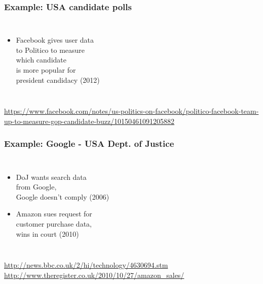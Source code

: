 \documentclass[dvipsnames]{beamer}
\theoremstyle{plain}
\begin{document}
\begin{frame}
  \frametitle{Example: USA candidate polls}

  \begin{columns}

    \begin{itemize}
      \item Facebook gives user data\\
        to Politico to measure\\
        which candidate\\
        is more popular for\\
        president candidacy (2012)
    \end{itemize}
  \end{columns}

  \medskip
  \tiny{\url{https://www.facebook.com/notes/us-politics-on-facebook/politico-facebook-team-up-to-measure-gop-candidate-buzz/10150461091205882}}\\
\end{frame}

\begin{frame}
  \frametitle{Example: Google - USA Dept. of Justice}

  \begin{columns}

    \begin{itemize}
      \item DoJ wants search data\\
        from Google,\\
        Google doesn't comply (2006)

      \pause
      \medskip
      \item Amazon sues request for\\
        customer purchase data,\\
        wins in court (2010)
    \end{itemize}
  \end{columns}

  \medskip
  \tiny{\url{http://news.bbc.co.uk/2/hi/technology/4630694.stm}}\\
  \tiny{\url{http://www.theregister.co.uk/2010/10/27/amazon_sales/}}\\
\end{frame}
\end{document}
